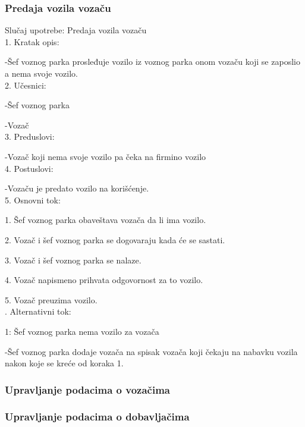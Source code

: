 \subsubsection{\bfseries Predaja vozila vozaču}
\noindent Slučaj upotrebe: Predaja vozila vozaču\\
1. Kratak opis: 
\par -Šef voznog parka prosleđuje vozilo iz voznog parka onom vozaču koji se zaposlio a nema svoje vozilo.\\
2. Učesnici:
\par -Šef voznog parka
\par -Vozač\\
3. Preduslovi:
\par -Vozač koji nema svoje vozilo pa čeka na firmino vozilo\\
4. Postuslovi:
\par -Vozaču je predato vozilo na korišćenje.\\
5. Osnovni tok:
\par 1. Šef voznog parka obaveštava vozača da li ima vozilo.
\par 2. Vozač i šef voznog parka se dogovaraju kada će se sastati.
\par 3. Vozač i šef voznog parka se nalaze.
\par 4. Vozač napismeno prihvata odgovornost za to vozilo.
\par 5. Vozač preuzima vozilo.\\

. Alternativni tok:
	\par 1: Šef voznog parka nema vozilo za vozača
	\par -Šef voznog parka dodaje vozača na spisak vozača koji čekaju na nabavku vozila nakon koje se kreće od koraka 1.
	
\subsubsection{\bfseries Upravljanje podacima o vozačima}

\subsubsection{\bfseries Upravljanje podacima o dobavljačima}